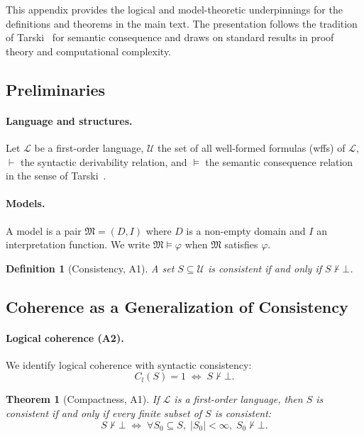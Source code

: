 \documentclass{article}
\newcommand{\Univ}{\mathcal{U}}
\newtheorem{theorem}{Theorem}
\newtheorem{definition}{Definition}
\begin{document}
This appendix provides the logical and model-theoretic underpinnings for the
definitions and theorems in the main text.  The presentation follows the
tradition of Tarski~\cite{tarski1936} for semantic consequence and draws on
standard results in proof theory and computational complexity.

\subsection{Preliminaries}
\label{app:prelim}

\paragraph{Language and structures.}
Let $\mathcal{L}$ be a first-order language, $\Univ$ the set of all
well-formed formulas (wffs) of $\mathcal{L}$, $\vdash$ the syntactic
derivability relation, and $\models$ the semantic consequence relation in the
sense of Tarski~\cite{tarski1936}.

\paragraph{Models.}
A model is a pair $\mathfrak{M} = (D, I)$ where $D$ is a non-empty domain and
$I$ an interpretation function.  We write $\mathfrak{M} \models \varphi$ when
$\mathfrak{M}$ satisfies $\varphi$.

\begin{definition}[Consistency, A1]
A set $S \subseteq \Univ$ is \emph{consistent} if and only if $S \nvdash \bot$.
\end{definition}

\subsection{Coherence as a Generalization of Consistency}
\label{app:coherence-gen}

\paragraph{Logical coherence (A2).}
We identify logical coherence with syntactic consistency:
\[
  C_l(S) = 1 \;\iff\; S \nvdash \bot.
\]

\begin{theorem}[Compactness, A1]
\label{thm:compactness}
If $\mathcal{L}$ is a first-order language, then $S$ is consistent if and only
if every finite subset of $S$ is consistent:
\[
  S \nvdash \bot \;\iff\;
  \forall S_0 \subseteq S,\; |S_0| < \infty,\; S_0 \nvdash \bot.
\]
\end{theorem}
\end{document}
